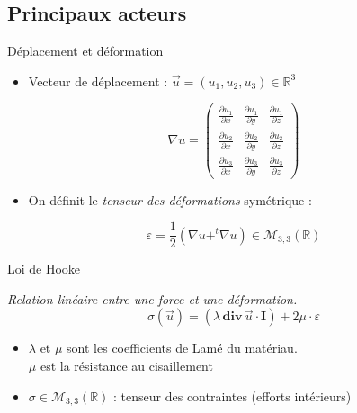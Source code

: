 \documentclass[french]{beamer}
\begin{document}
\subsection{Principaux acteurs}
\begin{frame}{Déplacement et déformation}
  \begin{itemize}
    \item Vecteur de déplacement : $\vec{u}=(u_1,u_2,u_3) \in \mathbb{R}^3 $
  \end{itemize}
  \pause
  \vspace{2pt}

  \begin{equation}
    \nabla u =  
    \left(
    \begin{array}{ccc}
      \frac{\partial u_1}{\partial x } & \frac{\partial u_1}{\partial y } & 
      \frac{\partial u_1}{\partial z }  \\
      \frac{\partial u_2}{\partial x } & \frac{\partial u_2}{\partial y } & 
      \frac{\partial u_2}{\partial z }  \\
      \frac{\partial u_3}{\partial x } & \frac{\partial u_3}{\partial y } & 
      \frac{\partial u_3}{\partial z } 
    \end{array}
    \right)
  \end{equation}
  \pause
  \vspace{2pt}
  \begin{itemize}
    \item On définit le \emph{tenseur des déformations} symétrique : 
  \end{itemize}

  \begin{equation}
    \boxed{\varepsilon = \frac{1}{2} \left( \nabla u + ^{t} \nabla u \right)} 
    \in \mathcal{M}_{3,3}(\mathbb{R})
  \end{equation}

\end{frame}


\begin{frame}{Loi de Hooke}

   \emph{Relation linéaire entre une force et une déformation.}
   \pause
  \begin{equation}
    \sigma \left(\vec{u}\right) = \left( \lambda \hspace{2pt}\mathbf{div} 
    \hspace{2pt}\vec{u} \cdot \mathbf{I} \right) + 2 \mu\cdot \varepsilon 
  \end{equation}
  \begin{itemize}
      \pause
    \item $\lambda$ et $\mu$ sont les coefficients de Lamé du matériau. \\
      \pause
      $\mu$ est la résistance au cisaillement 
      \pause
     \item $\sigma \in \mathcal{M}_{3,3}(\mathbb{R})$ : tenseur des contraintes (efforts intérieurs)
    
  \end{itemize}
\end{frame}
\end{document}
